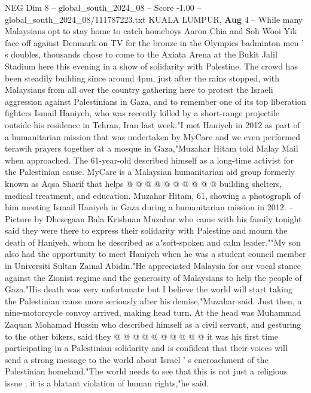 \begin{textsample}{NEG Dim 8 – global\_south\_2024\_08 – Score -1.00 – global\_south\_2024\_08/111787223.txt}  \label{ex:f8_neg_076}
KUALA LUMPUR, \textbf{Aug} 4 -- While many Malaysians opt to stay home to catch homeboys Aaron Chia and Soh Wooi Yik face off against Denmark on TV for the bronze in the Olympics badminton men ' s doubles, thousands chose to come to the Axiata Arena at the Bukit Jalil Stadium here this evening in a show of solidarity with Palestine.
The crowd has been steadily building since around 4pm, just after the rains stopped, with Malaysians from all over the country gathering here to protest the Israeli aggression against Palestinians in Gaza, and to remember one of its top liberation fighters Ismail Haniyeh, who was recently killed by a short-range projectile outside his residence in Tehran, Iran last week."I met Haniyeh in 2012 as part of a humanitarian mission that was undertaken by MyCare and we even performed terawih prayers together at a mosque in Gaza,"Muzahar Hitam told Malay Mail when approached.
The 61-year-old described himself as a long-time activist for the Palestinian cause.
MyCare is a Malaysian humanitarian aid group formerly known as Aqsa Sharif that helps @ @ @ @ @ @ @ @ @ @ building shelters, medical treatment, and education.
Muzahar Hitam, 61, showing a photograph of him meeting Ismail Haniyeh in Gaza during a humanitarian mission in 2012. -- Picture by Dhesegaan Bala Krishnan Muzahar who came with his family tonight said they were there to express their solidarity with Palestine and mourn the death of Haniyeh, whom he described as a"soft-spoken and calm leader.""My son also had the opportunity to meet Haniyeh when he was a student council member in Universiti Sultan Zainal Abidin."He appreciated Malaysia for our vocal stance against the Zionist regime and the generosity of Malaysians to help the people of Gaza."His death was very unfortunate but I believe the world will start taking the Palestinian cause more seriously after his demise,"Muzahar said.
Just then, a nine-motorcycle convoy arrived, making head turn.
At the head was Muhammad Zaquan Mohamad Hussin who described himself as a civil servant, and gesturing to the other bikers, said they @ @ @ @ @ @ @ @ @ @ it was his first time participating in a Palestinian solidarity and is confident that their voices will send a strong message to the world about Israel ' s encroachment of the Palestinian homeland."The world needs to see that this is not just a religious issue ; it is a blatant violation of human rights,"he said.

\end{textsample}
